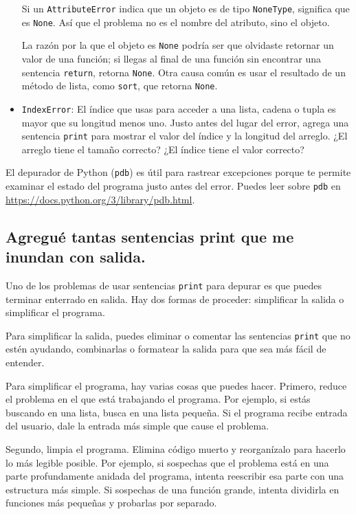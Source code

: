 \begin{itemize}
    Si un \texttt{AttributeError} indica que un objeto es de tipo \texttt{NoneType}, significa que es \texttt{None}. Así que el problema no es el nombre del atributo, sino el objeto.
    
    La razón por la que el objeto es \texttt{None} podría ser que olvidaste retornar un valor de una función; si llegas al final de una función sin encontrar una sentencia \texttt{return}, retorna \texttt{None}. Otra causa común es usar el resultado de un método de lista, como \texttt{sort}, que retorna \texttt{None}.
    
    \item \texttt{IndexError}: El índice que usas para acceder a una lista, cadena o tupla es mayor que su longitud menos uno. Justo antes del lugar del error, agrega una sentencia \texttt{print} para mostrar el valor del índice y la longitud del arreglo. ¿El arreglo tiene el tamaño correcto? ¿El índice tiene el valor correcto?
\end{itemize}

El depurador de Python (\texttt{pdb}) es útil para rastrear excepciones porque te permite examinar el estado del programa justo antes del error. Puedes leer sobre \texttt{pdb} en \url{https://docs.python.org/3/library/pdb.html}.

\subsection{Agregué tantas sentencias print que me inundan con salida.}

Uno de los problemas de usar sentencias \texttt{print} para depurar es que puedes terminar enterrado en salida. Hay dos formas de proceder: simplificar la salida o simplificar el programa.

Para simplificar la salida, puedes eliminar o comentar las sentencias \texttt{print} que no estén ayudando, combinarlas o formatear la salida para que sea más fácil de entender.

Para simplificar el programa, hay varias cosas que puedes hacer. Primero, reduce el problema en el que está trabajando el programa. Por ejemplo, si estás buscando en una lista, busca en una lista pequeña. Si el programa recibe entrada del usuario, dale la entrada más simple que cause el problema.

Segundo, limpia el programa. Elimina código muerto y reorganízalo para hacerlo lo más legible posible. Por ejemplo, si sospechas que el problema está en una parte profundamente anidada del programa, intenta reescribir esa parte con una estructura más simple. Si sospechas de una función grande, intenta dividirla en funciones más pequeñas y probarlas por separado.


